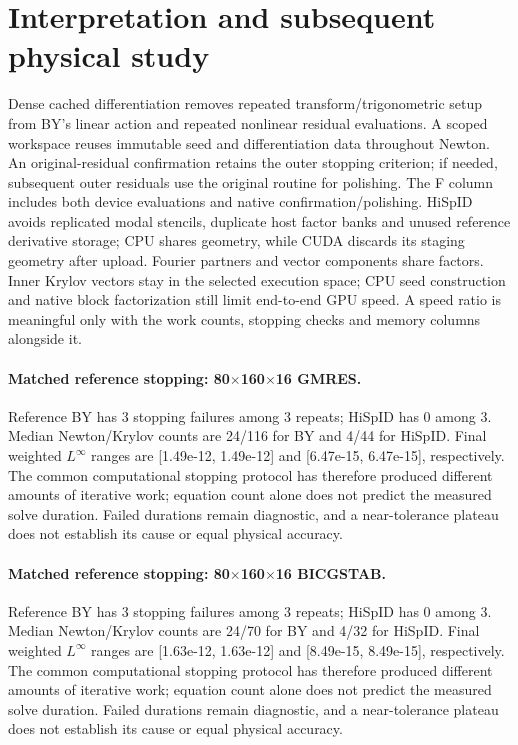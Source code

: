 \documentclass[11pt]{article}
\begin{document}
\section{Interpretation and subsequent physical study}
Dense cached differentiation removes repeated transform/trigonometric setup
from BY's linear action and repeated nonlinear residual evaluations. A scoped
workspace reuses immutable seed and differentiation data throughout Newton.
An original-residual confirmation retains the outer stopping criterion;
if needed, subsequent outer residuals use the original routine for polishing.
The F column includes both device evaluations and native confirmation/polishing.
HiSpID avoids replicated modal stencils, duplicate
host factor banks and unused reference derivative storage; CPU shares
geometry, while CUDA discards its staging geometry after upload. Fourier
partners and vector components share factors. Inner Krylov vectors stay in
the selected execution space; CPU seed construction and native block
factorization still limit end-to-end GPU speed. A speed ratio is meaningful
only with the work counts, stopping checks and memory columns alongside it.
\paragraph{Matched reference stopping: 80$\times$160$\times$16 GMRES.} Reference BY has 3 stopping failures among 3 repeats; HiSpID has 0 among 3. Median Newton/Krylov counts are 24/116 for BY and 4/44 for HiSpID. Final weighted $L^\infty$ ranges are [1.49e-12, 1.49e-12] and [6.47e-15, 6.47e-15], respectively. The common computational stopping protocol has therefore produced different amounts of iterative work; equation count alone does not predict the measured solve duration. Failed durations remain diagnostic, and a near-tolerance plateau does not establish its cause or equal physical accuracy.
\paragraph{Matched reference stopping: 80$\times$160$\times$16 BICGSTAB.} Reference BY has 3 stopping failures among 3 repeats; HiSpID has 0 among 3. Median Newton/Krylov counts are 24/70 for BY and 4/32 for HiSpID. Final weighted $L^\infty$ ranges are [1.63e-12, 1.63e-12] and [8.49e-15, 8.49e-15], respectively. The common computational stopping protocol has therefore produced different amounts of iterative work; equation count alone does not predict the measured solve duration. Failed durations remain diagnostic, and a near-tolerance plateau does not establish its cause or equal physical accuracy.
\end{document}
